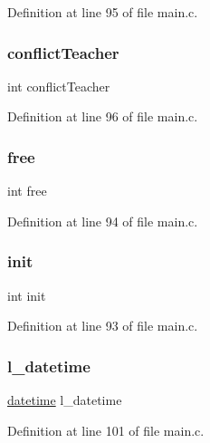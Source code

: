 Definition at line 95 of file main.\+c.

\hypertarget{structlecture_a5459cfc525141e5592d505c28d625d96}{}\label{structlecture_a5459cfc525141e5592d505c28d625d96} 
\subsubsection{\texorpdfstring{conflict\+Teacher}{conflictTeacher}}
{\footnotesize\ttfamily int conflict\+Teacher}



Definition at line 96 of file main.\+c.

\hypertarget{structlecture_a4573817871ec032055c7d539617626fe}{}\label{structlecture_a4573817871ec032055c7d539617626fe} 
\subsubsection{\texorpdfstring{free}{free}}
{\footnotesize\ttfamily int free}



Definition at line 94 of file main.\+c.

\hypertarget{structlecture_a795ea50921b36311ffd5e7baa2ef1f7e}{}\label{structlecture_a795ea50921b36311ffd5e7baa2ef1f7e} 
\subsubsection{\texorpdfstring{init}{init}}
{\footnotesize\ttfamily int init}



Definition at line 93 of file main.\+c.

\hypertarget{structlecture_a31d3e72684a3e6f8c76c85a468468efa}{}\label{structlecture_a31d3e72684a3e6f8c76c85a468468efa} 
\subsubsection{\texorpdfstring{l\+\_\+datetime}{l\_datetime}}
{\footnotesize\ttfamily \hyperlink{structdatetime}{datetime} l\+\_\+datetime}



Definition at line 101 of file main.\+c.

